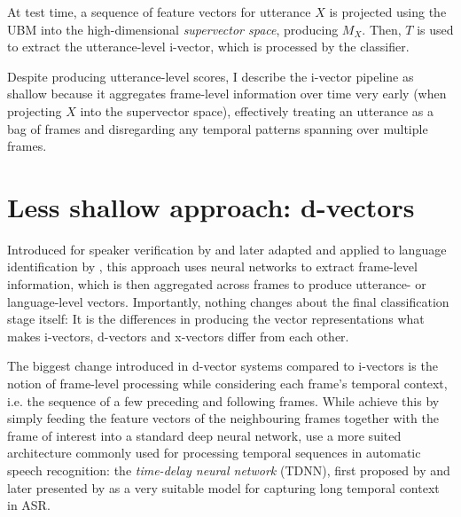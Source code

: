 \documentclass[bsc,frontabs,twoside,singlespacing,parskip,deptreport]{infthesis}
\begin{document}
{{    At test time, a sequence of feature vectors for utterance $X$ is projected using the UBM into the high-dimensional \textit{supervector space}, producing $M_X$. Then, $T$ is used to extract the utterance-level i-vector, which is processed by the classifier.

    Despite producing utterance-level scores, I describe the i-vector pipeline as shallow because it aggregates frame-level information over time very early (when projecting $X$ into the supervector space), effectively treating an utterance as a bag of frames and disregarding any temporal patterns spanning over multiple frames.
  }

  \section{Less shallow approach: d-vectors}{
    \label{sec:d-vectors}
    Introduced for speaker verification by \citet{Variani_et_al_2014} and later adapted and applied to language identification by \citet{dvectors_lid}, this approach uses neural networks to extract frame-level information, which is then aggregated across frames to produce utterance- or language-level vectors. Importantly, nothing changes about the final classification stage itself: It is the differences in producing the vector representations what makes i-vectors, d-vectors and x-vectors differ from each other.
    

    The biggest change introduced in d-vector systems compared to i-vectors is the notion of frame-level processing while considering each frame's temporal context, i.e. the sequence of a few preceding and following frames. While \citeauthor{Variani_et_al_2014} achieve this by simply feeding the feature vectors of the neighbouring frames together with the frame of interest into a standard deep neural network, \citeauthor{dvectors_lid} use a more suited architecture commonly used for processing temporal sequences in automatic speech recognition: the \textit{time-delay neural network} (TDNN), first proposed by \citet{waibel1995phoneme} and later presented by \citet{peddinti2015time} as a very suitable model for capturing long temporal context in ASR.

}}
\end{document}
